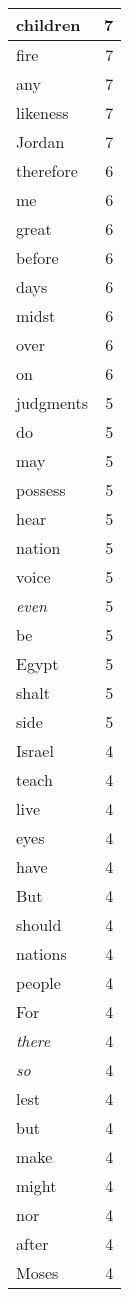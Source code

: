 \begin{center}
\begin{longtable}{l|r}
children & 7 \\ \hline
fire & 7 \\ \hline
any & 7 \\ \hline
likeness & 7 \\ \hline
Jordan & 7 \\ \hline
therefore & 6 \\ \hline
me & 6 \\ \hline
great & 6 \\ \hline
before & 6 \\ \hline
days & 6 \\ \hline
midst & 6 \\ \hline
over & 6 \\ \hline
on & 6 \\ \hline
judgments & 5 \\ \hline
do & 5 \\ \hline
may & 5 \\ \hline
possess & 5 \\ \hline
hear & 5 \\ \hline
nation & 5 \\ \hline
voice & 5 \\ \hline
\emph{even} & 5 \\ \hline
be & 5 \\ \hline
Egypt & 5 \\ \hline
shalt & 5 \\ \hline
side & 5 \\ \hline
Israel & 4 \\ \hline
teach & 4 \\ \hline
live & 4 \\ \hline
eyes & 4 \\ \hline
have & 4 \\ \hline
But & 4 \\ \hline
should & 4 \\ \hline
nations & 4 \\ \hline
people & 4 \\ \hline
For & 4 \\ \hline
\emph{there} & 4 \\ \hline
\emph{so} & 4 \\ \hline
lest & 4 \\ \hline
but & 4 \\ \hline
make & 4 \\ \hline
might & 4 \\ \hline
nor & 4 \\ \hline
after & 4 \\ \hline
Moses & 4 \\ \hline

\end{longtable}
\end{center}
